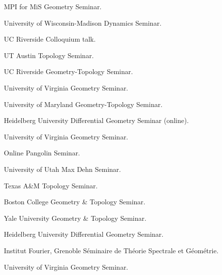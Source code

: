 {MPI for MiS}
{Geometry Seminar.}
{}

{University of Wisconsin-Madison}
{Dynamics Seminar.}
{}

{UC Riverside}
{Colloquium talk.}
{}

{UT Austin}
{Topology Seminar.}
{}

{UC Riverside}
{Geometry-Topology Seminar.}
{}

{University of Virginia}
{Geometry Seminar.}
{}

{University of Maryland}
{Geometry-Topology Seminar.}
{}

{Heidelberg University}
{Differential Geometry Seminar (online).}
{}

{University of Virginia}
{Geometry Seminar.}
{}

{Online}
{Pangolin Seminar.}
{}

{University of Utah}
{Max Dehn Seminar.}
{}

{Texas A\&M}
{Topology Seminar.}
{}

{Boston College}
{Geometry \& Topology Seminar.}
{}

{Yale University}
{Geometry \& Topology Seminar.}
{}

{Heidelberg University}
{Differential Geometry Seminar.}
{}

{Institut Fourier, Grenoble}
{S\'eminaire de Th\'eorie Spectrale et G\'eom\'etrie.}
{}

{University of Virginia}
{Geometry Seminar.}
{}


